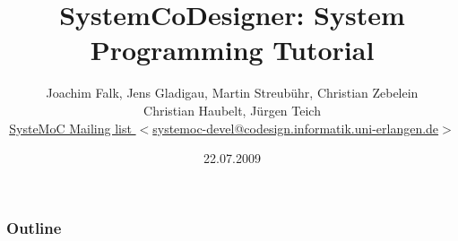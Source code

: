 {
}

{
\usenavigationsymbolstemplate{} %

}


\usepackage[utf8]{inputenc}
\usepackage{pslatex}
\usepackage{graphicx}

\usepackage{listings}
\lstset{language=C++,showstringspaces=false,breaklines=true,basicstyle=\ttfamily}

{
\lstset{commentstyle=\scriptsize\selectfont}
\lstset{basicstyle=\scriptsize\ttfamily\selectfont}
}

\newcommand{\SysteMoC}{\emph{SysteMoC}}
\newcommand{\SystemCoDesigner}{\emph{SystemCoDesigner}}
\newcommand{\concat}{{}^{\smallfrown}}
\newcommand{\length}{\#}



\title{SystemCoDesigner: System Programming Tutorial}
\author[SCD Group]{Joachim Falk, Jens Gladigau, Martin Streubühr, Christian Zebelein\\ Christian Haubelt, Jürgen Teich\texorpdfstring{\\}{}
    {\tiny \href{mailto:systemoc-devel@codesign.informatik.uni-erlangen.de}{SysteMoC Mailing list $<$systemoc-devel@codesign.informatik.uni-erlangen.de$>$}}}
{
}
\date{22.07.2009}




\begin{frame}
  \titlepage
\end{frame}

\begin{frame}
  \frametitle{Outline}
  \tableofcontents
\end{frame}



